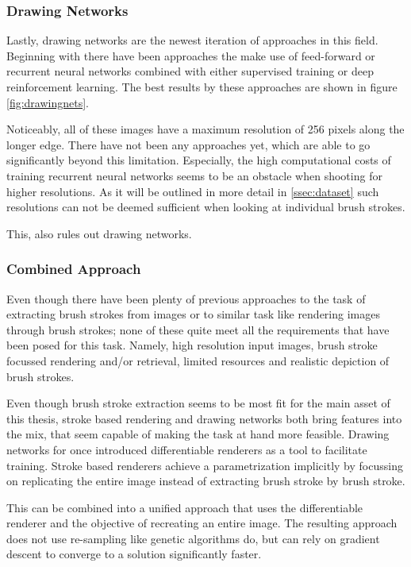 \subsubsection{Drawing Networks}
Lastly, drawing networks are the newest iteration of approaches in this field.
Beginning with  there have been approaches the make use
of feed-forward or recurrent neural networks combined with either supervised training
or deep reinforcement learning.
The best results by these approaches are shown in figure \ref{fig:drawingnets}.

Noticeably, all of these images have a maximum resolution of 256 pixels along the
longer edge.
There have not been any approaches yet, which are able to go significantly beyond
this limitation.
Especially, the high computational costs of training recurrent neural networks seems
to be an obstacle when shooting for higher resolutions.
As it will be outlined in more detail in \ref{ssec:dataset} such resolutions can not
be deemed sufficient when looking at individual brush strokes.

This, also rules out drawing networks.

\subsubsection{Combined Approach}

Even though there have been plenty of previous approaches to the task of extracting
brush strokes from images or to similar task like rendering images through brush strokes;
none of these quite meet all the requirements that have been posed for this task.
Namely, high resolution input images, brush stroke focussed rendering and/or retrieval,
limited resources and realistic depiction of brush strokes.

Even though brush stroke extraction seems to be most fit for the main asset of
this thesis, stroke based rendering and drawing networks both bring features into
the mix, that seem capable of making the task at hand more feasible.
Drawing networks for once introduced differentiable renderers as a tool to facilitate
training.
Stroke based renderers achieve a parametrization implicitly by focussing on replicating
the entire image instead of extracting brush stroke by brush stroke.

This can be combined into a unified approach that uses the differentiable renderer
and the objective of recreating an entire image.
The resulting approach does not use re-sampling like genetic algorithms do, but
can rely on gradient descent to converge to a solution significantly faster.

